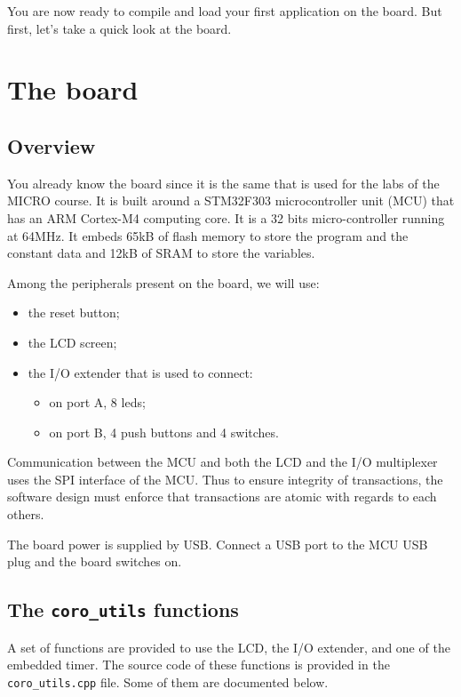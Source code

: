 \documentclass[11pt]{report}
\begin{document}
You are now ready to compile and load your first application on the board. But first, let's take a quick look at the board.

\chapter{The board}

\section{Overview}

You already know the board since it is the same that is used for the labs of the MICRO course.
It is built around a STM32F303 microcontroller unit (MCU) that has an ARM Cortex-M4 computing core.
It is a 32 bits micro-controller running at 64MHz.
It embeds 65kB of flash memory to store the program and the constant data and 12kB of SRAM to store the variables.

Among the peripherals present on the board, we will use:
\begin{itemize}
    \item the reset button;
    \item the LCD screen;
    \item the I/O extender that is used to connect:
    \begin{itemize}
        \item on port A, 8 leds;
        \item on port B, 4 push buttons and 4 switches.
    \end{itemize}
\end{itemize}

Communication between the MCU and both the LCD and the I/O multiplexer uses the SPI interface of the MCU.
Thus to ensure integrity of transactions, the software design must enforce that transactions are atomic with regards to each others.

The board power is supplied by USB.
Connect a USB  port to the MCU USB plug and the board switches on.

\section{The \texttt{coro_utils} functions}
\label{sec:coroutils}

A set of functions are provided to use the LCD, the I/O extender, and one of the embedded timer.
The source code of these functions is provided in the \texttt{coro_utils.cpp} file.
Some of them are documented below.
\end{document}

